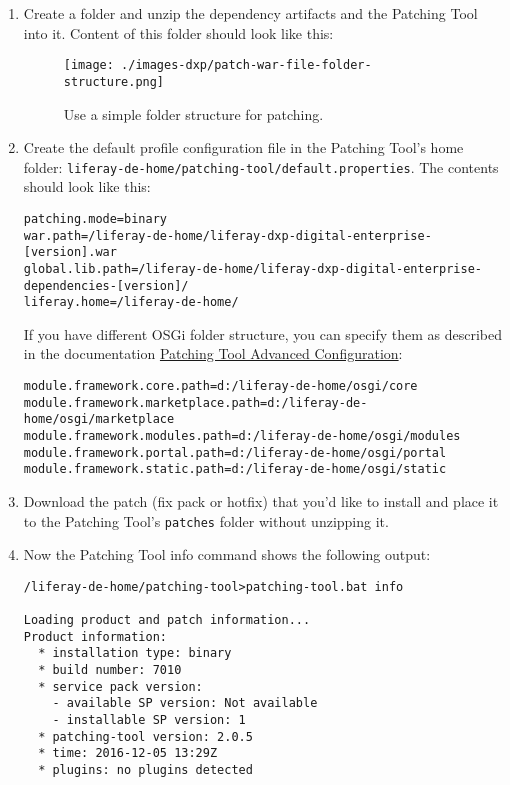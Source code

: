 \begin{enumerate}
\def\labelenumi{\arabic{enumi}.}
\item
  Create a folder and unzip the dependency artifacts and the Patching
  Tool into it. Content of this folder should look like this:

  \begin{figure}
  \centering
  \texttt{[image: ./images-dxp/patch-war-file-folder-structure.png]}
  \caption{Use a simple folder structure for patching.}
  \end{figure}
\item
  Create the default profile configuration file in the Patching Tool's
  home folder:
  \texttt{liferay-de-home/patching-tool/default.properties}. The
  contents should look like this:

\begin{verbatim}
patching.mode=binary
war.path=/liferay-de-home/liferay-dxp-digital-enterprise-[version].war
global.lib.path=/liferay-de-home/liferay-dxp-digital-enterprise-dependencies-[version]/
liferay.home=/liferay-de-home/
\end{verbatim}

  If you have different OSGi folder structure, you can specify them as
  described in the documentation
  \href{/docs/7-0/deploy/-/knowledge_base/d/patching-tool-advanced-configuration}{Patching
  Tool Advanced Configuration}:

\begin{verbatim}
module.framework.core.path=d:/liferay-de-home/osgi/core
module.framework.marketplace.path=d:/liferay-de-home/osgi/marketplace
module.framework.modules.path=d:/liferay-de-home/osgi/modules
module.framework.portal.path=d:/liferay-de-home/osgi/portal
module.framework.static.path=d:/liferay-de-home/osgi/static 
\end{verbatim}
\item
  Download the patch (fix pack or hotfix) that you'd like to install and
  place it to the Patching Tool's \texttt{patches} folder without
  unzipping it.
\item
  Now the Patching Tool info command shows the following output:

\begin{verbatim}
/liferay-de-home/patching-tool>patching-tool.bat info

Loading product and patch information...
Product information:
  * installation type: binary
  * build number: 7010
  * service pack version:
    - available SP version: Not available
    - installable SP version: 1
  * patching-tool version: 2.0.5
  * time: 2016-12-05 13:29Z
  * plugins: no plugins detected


\end{verbatim}
\end{enumerate}
